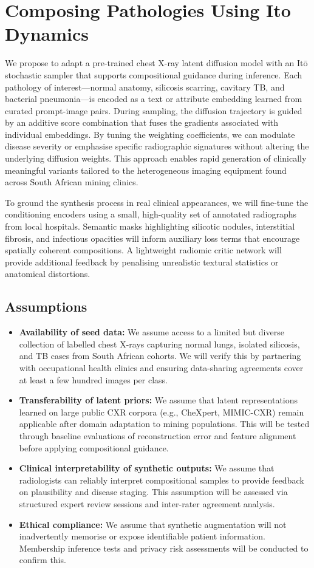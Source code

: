 \section{Composing Pathologies Using Ito Dynamics}
We propose to adapt a pre-trained chest X-ray latent diffusion model with an It\={o} stochastic sampler that supports compositional guidance during inference. Each pathology of interest---normal anatomy, silicosis scarring, cavitary TB, and bacterial pneumonia---is encoded as a text or attribute embedding learned from curated prompt-image pairs. During sampling, the diffusion trajectory is guided by an additive score combination that fuses the gradients associated with individual embeddings. By tuning the weighting coefficients, we can modulate disease severity or emphasise specific radiographic signatures without altering the underlying diffusion weights. This approach enables rapid generation of clinically meaningful variants tailored to the heterogeneous imaging equipment found across South African mining clinics.

To ground the synthesis process in real clinical appearances, we will fine-tune the conditioning encoders using a small, high-quality set of annotated radiographs from local hospitals. Semantic masks highlighting silicotic nodules, interstitial fibrosis, and infectious opacities will inform auxiliary loss terms that encourage spatially coherent compositions. A lightweight radiomic critic network will provide additional feedback by penalising unrealistic textural statistics or anatomical distortions.
\subsection{Assumptions}
\begin{itemize}
    \item \textbf{Availability of seed data:} We assume access to a limited but diverse collection of labelled chest X-rays capturing normal lungs, isolated silicosis, and TB cases from South African cohorts. We will verify this by partnering with occupational health clinics and ensuring data-sharing agreements cover at least a few hundred images per class.
    \item \textbf{Transferability of latent priors:} We assume that latent representations learned on large public CXR corpora (e.g., CheXpert, MIMIC-CXR) remain applicable after domain adaptation to mining populations. This will be tested through baseline evaluations of reconstruction error and feature alignment before applying compositional guidance.
    \item \textbf{Clinical interpretability of synthetic outputs:} We assume that radiologists can reliably interpret compositional samples to provide feedback on plausibility and disease staging. This assumption will be assessed via structured expert review sessions and inter-rater agreement analysis.
    \item \textbf{Ethical compliance:} We assume that synthetic augmentation will not inadvertently memorise or expose identifiable patient information. Membership inference tests and privacy risk assessments will be conducted to confirm this.
\end{itemize}
